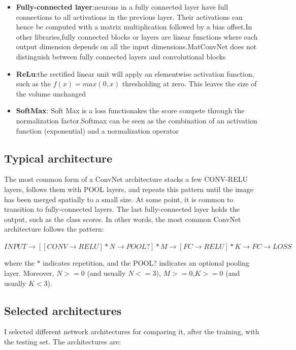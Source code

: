 \documentclass[]{report}
\begin{document}
\begin{itemize}
\item \textbf{Fully-connected layer}:neurons in a fully connected layer have full connections to all activations in the previous layer. Their activations can hence be computed with a matrix multiplication followed by a bias offset.In other libraries,fully connected blocks or layers are linear functions where each output dimension depends on all the input dimensions.MatConvNet does not distinguish between fully connected layers and convolutional blocks

\item \textbf{ReLu}:the rectified linear unit will apply an elementwise activation function, such as the $ f(x) = max(0,x) $ thresholding at zero. This leaves the size of the volume unchanged 

\item \textbf{SoftMax}: Soft Max is a loss functionakes the score compete through the normalization
factor.Softmax can be seen as the combination of an activation function
(exponential) and a normalization operator

\end{itemize}


\subsection{Typical architecture}

The most common form of a ConvNet architecture stacks a few CONV-RELU layers, follows them with POOL layers, and repeats this pattern until the image has been merged spatially to a small size. At some point, it is common to transition to fully-connected layers. The last fully-connected layer holds the output, such as the class scores. In other words, the most common ConvNet architecture follows the pattern:

$INPUT\rightarrow [[CONV\rightarrow RELU]*N\rightarrow POOL?]*M\rightarrow[FC\rightarrow RELU]*K\rightarrow FC \rightarrow LOSS $

where the $ * $ indicates repetition, and the POOL? indicates an optional pooling layer. Moreover, $ N>=0 $ (and usually $ N<=3 $), $M >= 0$,$ K >= 0$ (and usually $ K < 3$).

\subsection{Selected architectures}

I selected different network architectures for comparing it, after the training, with the testing set. The architectures are:
\end{document}
